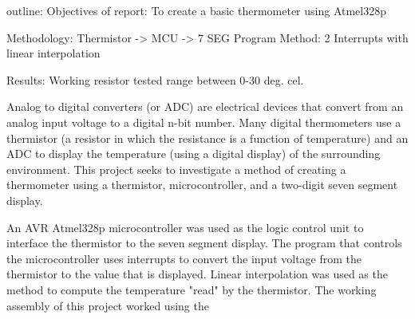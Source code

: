 outline:
Objectives of report: To create a basic thermometer using Atmel328p

Methodology: Thermistor -> MCU -> 7 SEG
Program Method: 2 Interrupts with linear interpolation

Results: Working resistor tested range between 0-30 deg. cel. 

Analog to digital converters (or ADC) are electrical devices that convert from
an analog input voltage to a digital n-bit number. Many digital thermometers use
a thermistor (a resistor in which the resistance is a function of temperature)
and an ADC to display the temperature (using a digital display) of the
surrounding environment. This project seeks to investigate a method of creating
a thermometer using a thermistor, microcontroller, and a two-digit seven segment
display.

An AVR Atmel328p microcontroller was used as the logic control unit to interface
the thermistor to the seven segment display. The program that controls the
microcontroller uses interrupts to convert the input voltage from the thermistor
to the value that is displayed. Linear interpolation was used as the method to
compute the temperature "read" by the thermistor. The working assembly of this
project worked using the 
